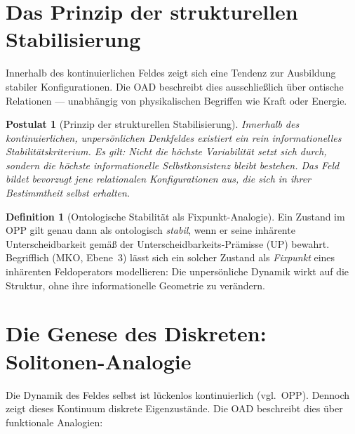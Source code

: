 \documentclass[11pt,a4paper]{article}
\theoremstyle{plain}
\newtheorem{postulate}{Postulat}[section]
\theoremstyle{definition}
\newtheorem{definition}{Definition}[section]
\begin{document}
\section{Das Prinzip der strukturellen Stabilisierung}

Innerhalb des kontinuierlichen Feldes zeigt sich eine Tendenz zur Ausbildung stabiler
Konfigurationen. Die OAD beschreibt dies ausschlie\ss{}lich \"{u}ber ontische
Relationen --- unabh\"{a}ngig von physikalischen Begriffen wie \glqq{}Kraft\grqq{} oder
\glqq{}Energie\grqq{}.

\begin{postulate}[Prinzip der strukturellen Stabilisierung]
Innerhalb des kontinuierlichen, unpers\"{o}nlichen Denkfeldes existiert ein rein
informationelles Stabilit\"{a}tskriterium. Es gilt: \emph{Nicht die h\"{o}chste
Variabilit\"{a}t setzt sich durch, sondern die h\"{o}chste informationelle
Selbstkonsistenz bleibt bestehen.} Das Feld bildet bevorzugt jene relationalen
Konfigurationen aus, die sich in ihrer Bestimmtheit selbst erhalten.
\end{postulate}

\begin{definition}[Ontologische Stabilit\"{a}t als Fixpunkt-Analogie]
Ein Zustand im OPP gilt genau dann als ontologisch \emph{stabil}, wenn er seine
inh\"{a}rente Unterscheidbarkeit gem\"{a}\ss{} der Unterscheidbarkeits-Pr\"{a}misse (UP)
bewahrt. Begrifflich (MKO, Ebene~3) l\"{a}sst sich ein solcher Zustand als
\emph{Fixpunkt} eines inh\"{a}renten Feldoperators modellieren: Die unpers\"{o}nliche
Dynamik wirkt auf die Struktur, ohne ihre informationelle Geometrie zu ver\"{a}ndern.
\end{definition}

\section{Die Genese des Diskreten: Solitonen-Analogie}

Die Dynamik des Feldes selbst ist l\"{u}ckenlos kontinuierlich (vgl.\ OPP). Dennoch
zeigt dieses Kontinuum diskrete Eigenzust\"{a}nde. Die OAD beschreibt dies \"{u}ber
funktionale Analogien:
\end{document}
